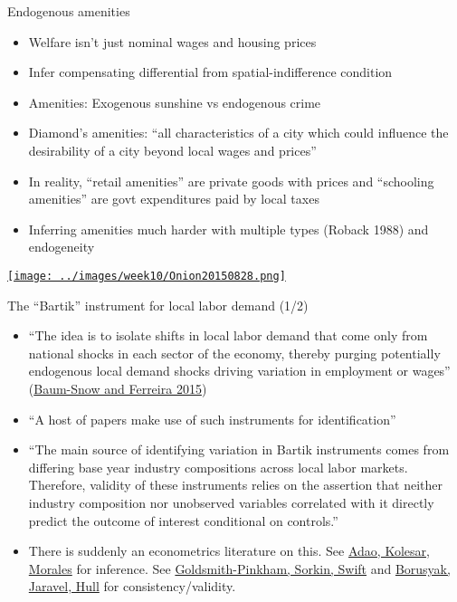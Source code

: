 \documentclass[11pt,notes=hide,aspectratio=169]{beamer}
\begin{document}
\begin{frame}{Endogenous amenities}
\begin{itemize}
	\item Welfare isn't just nominal wages and housing prices
	\item Infer compensating differential from spatial-indifference condition
	\item Amenities: Exogenous sunshine vs endogenous crime
	\item Diamond's amenities: ``all characteristics of a city which could influence the desirability of a city beyond local wages and prices''
	\item In reality, ``retail amenities'' are private goods with prices and ``schooling amenities'' are govt expenditures paid by local taxes
	\item Inferring amenities much harder with multiple types (Roback 1988) and endogeneity
\end{itemize}
\vspace{1mm}
\href{https://local.theonion.com/neighborhood-starting-to-get-too-safe-for-family-to-aff-1819578182}{\texttt{[image: ../images/week10/Onion20150828.png]}}
\end{frame}
\begin{frame}{The ``Bartik'' instrument for local labor demand (1/2)}
\begin{itemize}
	\item {\small ``The idea is to isolate shifts in local labor demand that come only from national shocks in each sector of the economy, thereby purging potentially endogenous local demand shocks driving variation in employment or wages'' (\href{https://ideas.repec.org/h/eee/regchp/5-3.html}{Baum-Snow and Ferreira 2015})\par}
	\item ``A host of papers make use of such instruments for identification''
	\item {\small ``The main source of identifying variation in Bartik instruments comes from differing base year industry compositions across local labor markets. Therefore, validity of these instruments relies on the assertion that neither industry composition nor unobserved variables correlated with it directly predict the outcome of interest conditional on controls.''\par}
	\item There is suddenly an econometrics literature on this. 
	See \href{https://academic.oup.com/qje/article-abstract/134/4/1949/5552146}{Adao, Kolesar, Morales} for inference.
	See \href{https://www.aeaweb.org/articles?id=10.1257/aer.20181047}{Goldsmith-Pinkham, Sorkin, Swift} and \href{http://about.peterhull.net/wp}{Borusyak, Jaravel, Hull} for consistency/validity.
\end{itemize}
\end{frame}
\end{document}
